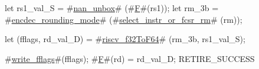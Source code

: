 let rs1_val_S = #\hyperref[sailRISCVznanzyunbox]{nan\_unbox}# (#\hyperref[sailRISCVzF]{F}#(rs1));
let rm_3b     = #\hyperref[sailRISCVzencdeczyroundingzymode]{encdec\_rounding\_mode}# (#\hyperref[sailRISCVzselectzyinstrzyorzyfcsrzyrm]{select\_instr\_or\_fcsr\_rm}#  (rm));

let (fflags, rd_val_D) = #\hyperref[sailRISCVzriscvzyf32ToF64]{riscv\_f32ToF64}# (rm_3b, rs1_val_S);

#\hyperref[sailRISCVzwritezyfflags]{write\_fflags}#(fflags);
#\hyperref[sailRISCVzF]{F}#(rd) = rd_val_D;
RETIRE_SUCCESS
